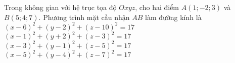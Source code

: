 \begin{ex}%
Trong không gian với hệ trục tọa độ $Oxyz$, cho hai điểm $A(1;-2;3)$ và $B(5;4;7)$. Phương trình mặt cầu nhận $AB$ làm đường kính là
\choice
{$(x-6)^2+(y-2)^2+(z-10)^2=17$}
{$(x-1)^2+(y+2)^2+(z-3)^2=17$}
{\True $(x-3)^2+(y-1)^2+(z-5)^2=17$}
{$(x-5)^2+(y-4)^2+(z-7)^2=17$}
\end{ex}

